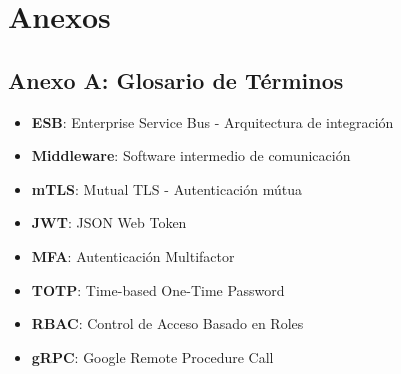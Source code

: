 \chapter{Anexos}

\section{Anexo A: Glosario de T\'erminos}

\begin{itemize}
\item \textbf{ESB}: Enterprise Service Bus - Arquitectura de integraci\'on
\item \textbf{Middleware}: Software intermedio de comunicaci\'on
\item \textbf{mTLS}: Mutual TLS - Autenticaci\'on m\'utua
\item \textbf{JWT}: JSON Web Token
\item \textbf{MFA}: Autenticaci\'on Multifactor
\item \textbf{TOTP}: Time-based One-Time Password
\item \textbf{RBAC}: Control de Acceso Basado en Roles
\item \textbf{gRPC}: Google Remote Procedure Call
\end{itemize}

\newpage
